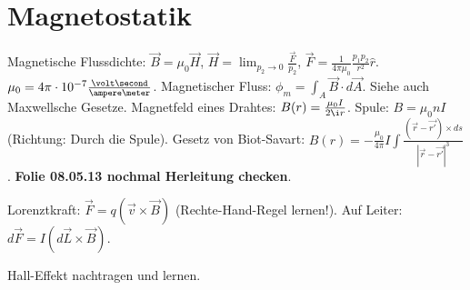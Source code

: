 \documentclass[a4paper,german,12pt,smallheadings]{scrartcl}
\begin{document}
\section{Magnetostatik}
Magnetische Flussdichte: $\vec{B} = \mu_0 \vec{H}$, $\vec{H} = \lim_{p_2 \to 0}
\frac{\vec{F}}{p_2}$, $\vec{F} = \frac{1}{4\pi\mu_0} \frac{p_1p_2}{r^2} \widehat{r}$.
$\mu_0 = 4 \pi \cdot 10^{-7} \frac{\volt \second}{\ampere \meter}$.
Magnetischer Fluss: $\phi_{m} = \int_{A} \vec{B} \cdot d\vec{A}$. Siehe auch
Maxwellsche Gesetze. Magnetfeld eines Drahtes: $B(r) = \frac{\mu_0 I}{2 \i r}$.
Spule: $B = \mu_0 n I$ (Richtung: Durch die Spule). Gesetz von Biot-Savart:
$B(r) = - \frac{\mu_0}{4 \pi} I \int \frac{(\vec{r} - \vec{r'}) \times
ds}{|\vec{r} - \vec{r'}|^3}$. \textbf{Folie 08.05.13 nochmal Herleitung checken}.

Lorenztkraft: $\vec{F} = q(\vec{v} \times \vec{B})$ (Rechte-Hand-Regel
lernen!). Auf Leiter: $d\vec{F} = I (d\vec{L} \times \vec{B})$.

Hall-Effekt nachtragen und lernen.
\end{document}
